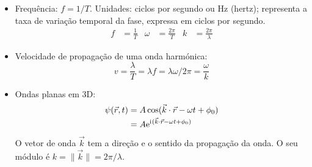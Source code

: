 \begin{itemize}
\begin{center}
    \end{center}
  \item Frequência: $f=1/T$. Unidades: ciclos por segundo ou Hz (hertz);
    representa a taxa de variação temporal da fase, expressa em ciclos por
    segundo.
    \begin{align*}
      f&=\frac{1}{T}&\omega&=\frac{2\pi}{T}&k&=\frac{2\pi}{\lambda}
    \end{align*}
\item Velocidade de propagação de uma onda harmónica:
\begin{equation*}
v=\frac{\lambda}{T}=\lambda f=\lambda \omega/2\pi=\frac\omega k
\end{equation*}
\item Ondas planas em 3D:
  \begin{align*}
    \psi(\vec r,t)&=A\cos(\vec k\cdot \vec r-\omega t+\phi_0)\\
                  &=A\e^{\iu(\vec k\cdot \vec r-\omega t+\phi_0)}
  \end{align*}
  O vetor de onda $\vec k$ tem a direção e o sentido da propagação da onda. O
  seu módulo é $k=\|\vec k\|=2\pi/\lambda$.

\end{itemize}


